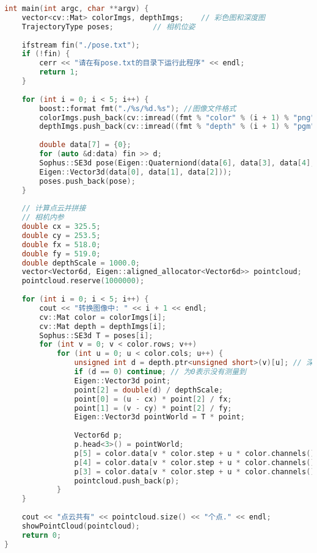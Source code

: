 \begin{lstlisting}[language=C++,caption=slambook/ch5/rgbd/jointMap.cpp（部分）]
int main(int argc, char **argv) {
    vector<cv::Mat> colorImgs, depthImgs;    // 彩色图和深度图
    TrajectoryType poses;         // 相机位姿
    
    ifstream fin("./pose.txt");
    if (!fin) {
        cerr << "请在有pose.txt的目录下运行此程序" << endl;
        return 1;
    }
    
    for (int i = 0; i < 5; i++) {
        boost::format fmt("./%s/%d.%s"); //图像文件格式
        colorImgs.push_back(cv::imread((fmt % "color" % (i + 1) % "png").str()));
        depthImgs.push_back(cv::imread((fmt % "depth" % (i + 1) % "pgm").str(), -1)); // 使用-1读取原始图像
        
        double data[7] = {0};
        for (auto &d:data) fin >> d;
        Sophus::SE3d pose(Eigen::Quaterniond(data[6], data[3], data[4], data[5]),
        Eigen::Vector3d(data[0], data[1], data[2]));
        poses.push_back(pose);
    }
    
    // 计算点云并拼接
    // 相机内参 
    double cx = 325.5;
    double cy = 253.5;
    double fx = 518.0;
    double fy = 519.0;
    double depthScale = 1000.0;
    vector<Vector6d, Eigen::aligned_allocator<Vector6d>> pointcloud;
    pointcloud.reserve(1000000);
    
    for (int i = 0; i < 5; i++) {
        cout << "转换图像中: " << i + 1 << endl;
        cv::Mat color = colorImgs[i];
        cv::Mat depth = depthImgs[i];
        Sophus::SE3d T = poses[i];
        for (int v = 0; v < color.rows; v++)
            for (int u = 0; u < color.cols; u++) {
                unsigned int d = depth.ptr<unsigned short>(v)[u]; // 深度值
                if (d == 0) continue; // 为0表示没有测量到
                Eigen::Vector3d point;
                point[2] = double(d) / depthScale;
                point[0] = (u - cx) * point[2] / fx;
                point[1] = (v - cy) * point[2] / fy;
                Eigen::Vector3d pointWorld = T * point;
                
                Vector6d p;
                p.head<3>() = pointWorld;
                p[5] = color.data[v * color.step + u * color.channels()];   // blue
                p[4] = color.data[v * color.step + u * color.channels() + 1]; // green
                p[3] = color.data[v * color.step + u * color.channels() + 2]; // red
                pointcloud.push_back(p);
            }
    }
    
    cout << "点云共有" << pointcloud.size() << "个点." << endl;
    showPointCloud(pointcloud);
    return 0;
}
\end{lstlisting}

